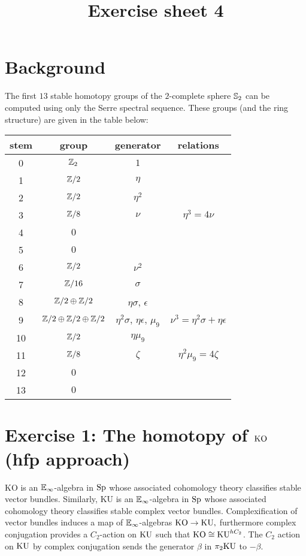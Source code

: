 \documentclass[reqno]{amsart}
\title{Exercise sheet 4}
\begin{document}
\maketitle


\section*{\bf Background}

The first $13$ stable homotopy groups of the $2$-complete sphere $\mathbb{S}_{2}$ can be computed using only the Serre spectral sequence. 
These groups (and the ring structure) are given in the table below:

\begin{center}
  \begin{tabular}{|c|c|c|c|}\hline
    stem & group & generator & relations \\\hline\hline
    0 & $\mathbb{Z}_2$ & $1$ & \\\hline
    1 & $\mathbb{Z}/2$ & $\eta$ & \\\hline
    2 & $\mathbb{Z}/2$ & $\eta^2$ & \\\hline
    3 & $\mathbb{Z}/8$ & $\nu$ & $\eta^3 = 4\nu$ \\\hline
    4 & $0$ & & \\\hline
    5 & $0$ & & \\\hline
    6 & $\mathbb{Z}/2$ & $\nu^2$ & \\\hline
    7 & $\mathbb{Z}/16$ & $\sigma$ & \\\hline
    8 & $\mathbb{Z}/2 \oplus \mathbb{Z}/2$ & $\eta\sigma$, $\epsilon$ & \\\hline
    9 & $\mathbb{Z}/2 \oplus \mathbb{Z}/2 \oplus \mathbb{Z}/2$ & $\eta^2\sigma$, $\eta\epsilon$, $\mu_9$ & $\nu^3 = \eta^2\sigma + \eta\epsilon$ \\\hline
    10 & $\mathbb{Z}/2$ & $\eta\mu_9$ & \\\hline
    11 & $\mathbb{Z}/8$ & $\zeta$ & $\eta^2\mu_9 = 4\zeta$ \\\hline
    12 & $0$ & & \\\hline
    13 & $0$& & \\\hline
  \end{tabular}
\end{center}


\section{\bf Exercise 1: The homotopy of $\mathrm{KO}$ (hfp approach)}

$\mathrm{KO}$ is an $\mathbb{E}_\infty$-algebra in $\mathrm{Sp}$ whose associated cohomology theory
classifies stable vector bundles.
Similarly, $\mathrm{KU}$ is an $\mathbb{E}_\infty$-algebra in $\mathrm{Sp}$ whose associated cohomology theory
classifies stable complex vector bundles.
Complexification of vector bundles induces a map of $\mathbb{E}_{\infty}$-algebras
$\mathrm{KO} \to \mathrm{KU},$
furthermore complex conjugation provides a $C_2$-action on $\mathrm{KU}$ such that
$\mathrm{KO} \cong \mathrm{KU}^{hC_2}$.
The $C_2$ action on $\mathrm{KU}$ by complex conjugation
sends the generator $\beta$ in $\pi_2\mathrm{KU}$ to $-\beta$.
\end{document}
